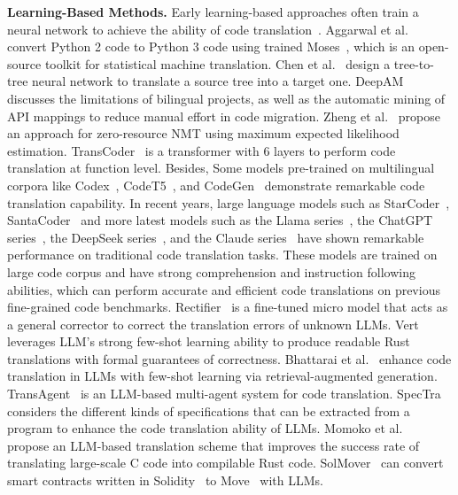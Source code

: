 \textbf{Learning-Based Methods.} 
Early learning-based approaches often train a neural network to achieve the ability of code translation~\cite{feng2020codebert,guo2020graphcodebert,wang2021codet5,guo2022unixcoder}.
Aggarwal et al.~\cite{aggarwal2015using} convert Python 2 code to Python 3 code using trained Moses~\cite{koehn2007moses}, which is an open-source toolkit for statistical machine translation.
Chen et al.~\cite{chen2018tree} design a tree-to-tree neural network to translate a source tree into a target one. DeepAM~\cite{gu2017deepam} discusses the limitations of bilingual projects, as well as the automatic mining of API mappings to reduce manual effort in code migration. 
Zheng et al.~\cite{zheng2017maximum} propose an approach for zero-resource NMT using maximum expected likelihood estimation.
TransCoder~\cite{lachaux2020transcoder} is a transformer with 6 layers to perform code translation at function level.
Besides, Some models pre-trained on multilingual corpora like Codex~\cite{chen2021evaluating}, CodeT5~\cite{wang2021codet5}, and CodeGen~\cite{nijkamp2022codegen} demonstrate remarkable code translation capability.
In recent years, large language models 
such as 
StarCoder~\cite{li2023starcoder,lozhkov2024starcoder}, SantaCoder~\cite{allal2023santacoder} and more latest models such as the Llama series~\cite{llama,llama2,llama3}, the ChatGPT series~\cite{openai2023gpt4}, the DeepSeek series~\cite{deepseekv2}, and the Claude series~\cite{Claude} have shown remarkable performance on traditional code translation tasks. These models are trained on large code corpus and have strong comprehension and instruction following abilities, 
which can perform accurate and efficient code translations on previous fine-grained code benchmarks. 
Rectifier~\cite{yin2024rectifier} is a fine-tuned micro model that acts as a general corrector to correct the translation errors of unknown LLMs. Vert~\cite{yang2024vert} leverages LLM's strong few-shot learning ability to 
produce readable Rust translations with formal guarantees of correctness.
Bhattarai et al.~\cite{bhattarai2024enhancing} enhance code translation in LLMs with few-shot learning via retrieval-augmented generation. 
TransAgent~\cite{yuan2024transagent} is an LLM-based multi-agent system for code translation.
SpecTra~\cite{nitin2024spectra} considers the different kinds of specifications that can be extracted from a program to enhance the code translation ability of LLMs. Momoko et al.~\cite{shiraishi2024context} propose an LLM-based translation scheme that improves the success rate of translating large-scale C code into compilable Rust code. SolMover~\cite{karanjai2024teaching} can convert smart contracts written in Solidity~\cite{solidity} to Move~\cite{move} with LLMs. 
